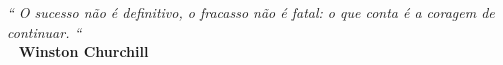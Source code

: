 \def\textoEpigrafe{
  O sucesso não é definitivo, o fracasso não é fatal:
  o que conta é a coragem de continuar.
}

\def\autorEpigrafe{Winston Churchill}

\begin{epigrafe}
  \vspace*{\fill}
  \hfill{}
  \parbox{6cm}{
    \begin{flushright}
      \textit{``\textoEpigrafe``}\\
      \bigbreak\
      \textbf{\autorEpigrafe}
  
    \end{flushright}
  }
\end{epigrafe}